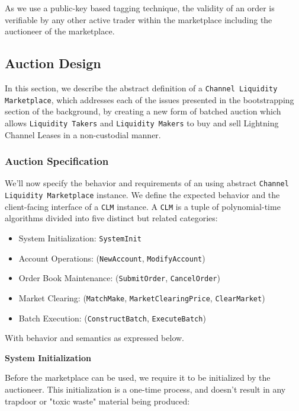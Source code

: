 \documentclass[10pt,a4paper]{article}
\theoremstyle{definition}
\begin{document}
As we use a public-key based tagging technique, the validity of an order is
verifiable by any other active trader within the marketplace including the
auctioneer of the marketplace.


\subsection{Auction Design}

In this section, we describe the abstract definition of a \texttt{Channel
Liquidity Marketplace}, which addresses each of the issues presented in the
bootstrapping section of the background, by creating a new form of batched
auction which allows \texttt{Liquidity Takers} and \texttt{Liquidity Makers} to
buy and sell Lightning Channel Leases in a non-custodial manner.

\subsubsection{Auction Specification}

We'll now specify the behavior and requirements of an using abstract
\texttt{Channel Liquidity Marketplace} instance. We define the expected
behavior and the client-facing interface of a \texttt{CLM} instance. A
\texttt{CLM} is a tuple of polynomial-time algorithms divided into five
distinct but related categories:
\begin{itemize}
    \item System Initialization: \texttt{SystemInit}
    \item Account Operations: (\texttt{NewAccount}, \texttt{ModifyAccount})
    \item Order Book Maintenance: (\texttt{SubmitOrder}, \texttt{CancelOrder})
    \item Market Clearing: (\texttt{MatchMake}, \texttt{MarketClearingPrice}, \texttt{ClearMarket})
    \item Batch Execution: (\texttt{ConstructBatch}, \texttt{ExecuteBatch})
\end{itemize}


With behavior and semantics as expressed below. \\

\begin{center}
    \textbf{System Initialization}
\end{center}

Before the marketplace can be used, we require it to be initialized by the
auctioneer. This initialization is a one-time process, and doesn't result in
any trapdoor or "toxic waste" material being produced: \\
\end{document}
